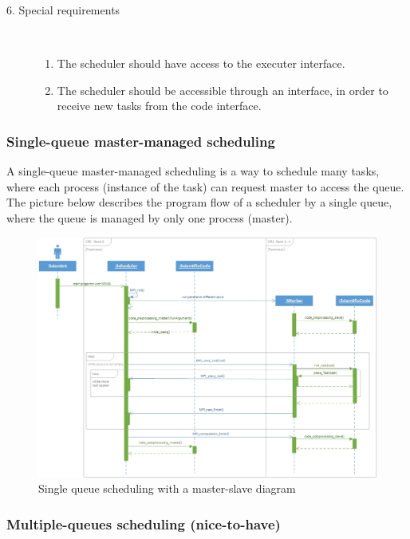 \begin{description}
	\item [6. Special requirements]\hfill \\
	\vspace{-6.5mm}
	\begin{enumerate}
		\item The scheduler should have access to the executer interface.
		\item The scheduler should be accessible through an interface, in order to receive new tasks from the code interface.
	\end{enumerate}
	
\end{description}
\vspace{0.5cm}
\subsubsection{Single-queue master-managed scheduling}
\vspace{0.5cm}
A single-queue master-managed scheduling is a way to schedule many tasks, where each process (instance of the task) can request master to access the queue. The picture below describes the program flow of a scheduler by a single queue, where the queue is managed by only one process (master). 
\vspace{1cm}
	\begin{figure}[H]
	\centering
	\includegraphics[width=15cm]{images/Master-slave.jpg}
	\caption{Single queue scheduling with a master-slave diagram} 
	\end{figure}
\newpage
\subsubsection{Multiple-queues scheduling (nice-to-have)}

